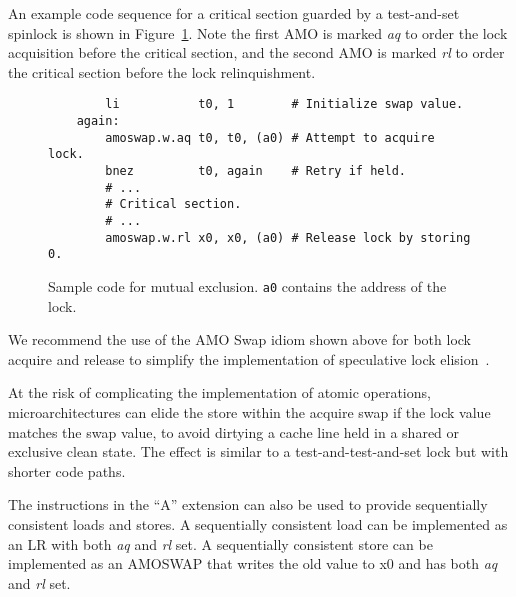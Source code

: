 An example code sequence for a critical section guarded by a
test-and-set spinlock is shown in Figure~\ref{critical}.  Note the
first AMO is marked {\em aq} to order the lock acquisition before the
critical section, and the second AMO is marked {\em rl} to order
the critical section before the lock relinquishment.

\begin{figure}[h!]
\begin{center}
\begin{verbatim}
        li           t0, 1        # Initialize swap value.
    again:
        amoswap.w.aq t0, t0, (a0) # Attempt to acquire lock.
        bnez         t0, again    # Retry if held.
        # ...
        # Critical section.
        # ...
        amoswap.w.rl x0, x0, (a0) # Release lock by storing 0.
\end{verbatim}
\end{center}
\caption{Sample code for mutual exclusion.  {\tt a0} contains the address of the lock.}
\label{critical}
\end{figure}

\begin{commentary}
We recommend the use of the AMO Swap idiom shown above for both lock
acquire and release to simplify the implementation of speculative lock
elision~\cite{Rajwar:2001:SLE}.

At the risk of complicating the implementation of atomic operations,
microarchitectures can elide the store within the acquire swap if the
lock value matches the swap value, to avoid dirtying a cache line held
in a shared or exclusive clean state.  The effect is similar to a
test-and-test-and-set lock but with shorter code paths.
\end{commentary}

The instructions in the ``A'' extension can also be used to provide
sequentially consistent loads and stores.  A sequentially consistent load can
be implemented as an LR with both {\em aq} and {\em rl} set. A sequentially
consistent store can be implemented as an AMOSWAP that writes the old value to
x0 and has both {\em aq} and {\em rl} set.
